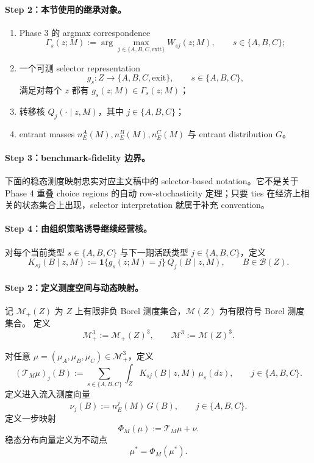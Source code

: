 \paragraph{Step 2：本节使用的继承对象。}
\begin{enumerate}
    \item Phase 3 的 argmax correspondence
    \[
    \Gamma_s(z;M):=\arg\max_{j\in\{A,B,C,\mathrm{exit}\}}W_{sj}(z;M),
    \qquad s\in\{A,B,C\};
    \]
    \item 一个可测 selector representation
    \[
    g_s:Z\to\{A,B,C,\mathrm{exit}\},
    \qquad s\in\{A,B,C\},
    \]
    满足对每个 $z$ 都有 $g_s(z;M)\in\Gamma_s(z;M)$；
    \item 转移核 $Q_j(\cdot\mid z,M)$，其中 $j\in\{A,B,C\}$；
    \item entrant masses $n_E^A(M),n_E^B(M),n_E^C(M)$ 与 entrant distribution $G$。
\end{enumerate}

\paragraph{Step 3：benchmark-fidelity 边界。}
下面的稳态测度映射忠实对应主文稿中的 selector-based notation。它不是关于 Phase 4 重叠 choice regions 的自动 row-stochasticity 定理；只要 ties 在经济上相关的状态集合上出现，selector interpretation 就属于补充 convention。

\paragraph{Step 4：由组织策略诱导继续经营核。}
对每个当前类型 $s\in\{A,B,C\}$ 与下一期活跃类型 $j\in\{A,B,C\}$，定义
\begin{equation}
K_{sj}(B\mid z,M):=\mathbf 1\{g_s(z;M)=j\}\,Q_j(B\mid z,M),
\qquad B\in\mathcal B(Z).
\label{eq:p7zh_Ksj}
\end{equation}

\paragraph{Step 2：定义测度空间与动态映射。}
记 $\mathcal M_+(Z)$ 为 $Z$ 上有限非负 Borel 测度集合，$\mathcal M(Z)$ 为有限符号 Borel 测度集合。
定义
\[
\mathcal M_+^3:=\mathcal M_+(Z)^3,
\qquad
\mathcal M^3:=\mathcal M(Z)^3.
\]

对任意 $\mu=(\mu_A,\mu_B,\mu_C)\in\mathcal M_+^3$，定义
\begin{equation}
(\mathcal T_M\mu)_j(B):=\sum_{s\in\{A,B,C\}}\int_Z K_{sj}(B\mid z,M)\,\mu_s(dz),
\qquad j\in\{A,B,C\}.
\label{eq:p7zh_T}
\end{equation}
定义进入流入测度向量
\begin{equation}
\nu_j(B):=n_E^j(M)\,G(B),
\qquad j\in\{A,B,C\}.
\label{eq:p7zh_nu}
\end{equation}
定义一步映射
\begin{equation}
\Phi_M(\mu):=\mathcal T_M\mu+\nu.
\label{eq:p7zh_Phi}
\end{equation}
稳态分布向量定义为不动点
\begin{equation}
\mu^*=\Phi_M(\mu^*).
\label{eq:p7zh_fixed_point}
\end{equation}

